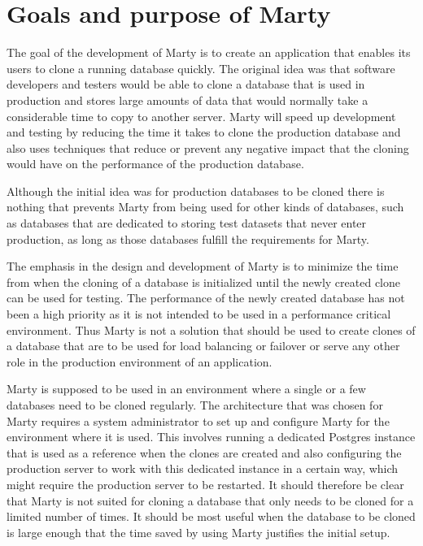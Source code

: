 \section{Goals and purpose of Marty}
The goal of the development of Marty is to create an application that enables its users to clone a running database quickly.
The original idea was that software developers and testers would be able to clone a database that is used in production and stores large amounts of data that would normally take a considerable time to copy to another server.
Marty will speed up development and testing by reducing the time it takes to clone the production database and also uses techniques that reduce or prevent any negative impact that the cloning would have on the performance of the production database. 

Although the initial idea was for production databases to be cloned there is nothing that prevents Marty from being used for other kinds of databases, such as databases that are dedicated to storing test datasets that never enter production, as long as those databases fulfill the requirements for Marty.

The emphasis in the design and development of Marty is to minimize the time from when the cloning of a database is initialized until the newly created clone can be used for testing.
The performance of the newly created database has not been a high priority as it is not intended to be used in a performance critical environment.
Thus Marty is not a solution that should be used to create clones of a database that are to be used for load balancing or failover or serve any other role in the production environment of an application.

Marty is supposed to be used in an environment where a single or a few databases need to be cloned regularly.
The architecture that was chosen for Marty requires a system administrator to set up and configure Marty for the environment where it is used.
This involves running a dedicated Postgres instance that is used as a reference when the clones are created and also configuring the production server to work with this dedicated instance in a certain way, which might require the production server to be restarted.
It should therefore be clear that Marty is not suited for cloning a database that only needs to be cloned for a limited number of times.
It should be most useful when the database to be cloned is large enough that the time saved by using Marty justifies the initial setup.